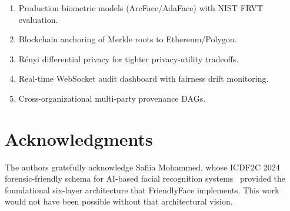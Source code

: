 \documentclass[conference]{IEEEtran}
\begin{document}
\begin{enumerate}[leftmargin=*]
\item Production biometric models (ArcFace/AdaFace) with NIST FRVT evaluation.
\item Blockchain anchoring of Merkle roots to Ethereum/Polygon.
\item R\'{e}nyi differential privacy for tighter privacy-utility tradeoffs.
\item Real-time WebSocket audit dashboard with fairness drift monitoring.
\item Cross-organizational multi-party provenance DAGs.
\end{enumerate}

\section*{Acknowledgments}

The authors gratefully acknowledge Safiia Mohammed, whose ICDF2C 2024 forensic-friendly schema for AI-based facial recognition systems~\cite{mohammed2024forensic} provided the foundational six-layer architecture that FriendlyFace implements. This work would not have been possible without that architectural vision.

\end{document}

